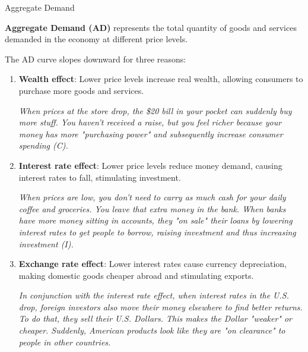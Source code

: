 \documentclass[10pt]{article}
\begin{document}
    \begin{core}{Aggregate Demand}

      \textbf{Aggregate Demand (AD)} represents the total quantity of goods and services demanded in the economy at different price levels.


      The AD curve slopes downward for three reasons:

      \begin{enumerate}

        \item \textbf{Wealth effect}: Lower price levels increase real wealth, allowing consumers to purchase more goods and services.

        \textit{When prices at the store drop, the \$20 bill in your pocket can suddenly buy more stuff. You haven't received a raise, but you feel richer because your money has more "purchasing power" and subsequently increase consumer spending (C).}

        \item \textbf{Interest rate effect}: Lower price levels reduce money demand, causing interest rates to fall, stimulating investment.

        \textit{When prices are low, you don't need to carry as much cash for your daily coffee and groceries. You leave that extra money in the bank. When banks have more money sitting in accounts, they "on sale" their loans by lowering interest rates to get people to borrow, raising investment and thus increasing investment (I).}

        \item \textbf{Exchange rate effect}: Lower interest rates cause currency depreciation, making domestic goods cheaper abroad and stimulating exports.

        \textit{In conjunction with the interest rate effect, when interest rates in the U.S. drop, foreign investors also move their money elsewhere to find better returns. To do that, they sell their U.S. Dollars. This makes the Dollar "weaker" or cheaper. Suddenly, American products look like they are "on clearance" to people in other countries.}


\end{enumerate}
\end{core}
\end{document}
